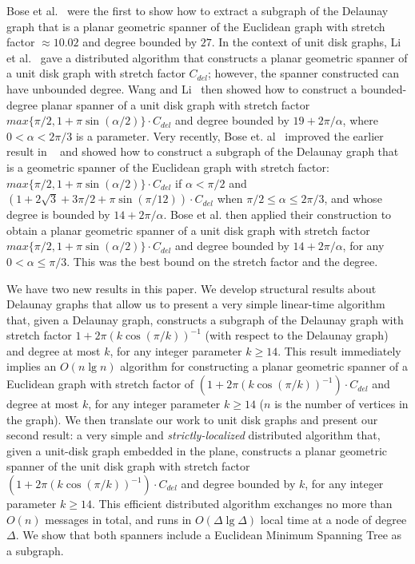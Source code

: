 \documentclass{stacs_proc}
\theoremstyle{plain}\newtheorem{satz}[thm]{Satz}
\begin{document}
Bose et al.~\cite{boseesa,bosealgorithmica} were the first to show
how to extract a subgraph of the Delaunay graph that is a planar
geometric spanner of the Euclidean graph with
stretch factor $\approx 10.02$ and degree bounded by $27$. In the
context of unit disk graphs, Li et
al.~\cite{iitunbounded1,iitunbounded} gave a distributed algorithm
that constructs a planar geometric spanner of a unit disk graph with
stretch factor $C_{del}$; however, the spanner constructed can have
unbounded degree. Wang and Li~\cite{iitbounded1,iitbounded} then
showed how to construct a bounded-degree planar spanner of a unit
disk graph with stretch factor $max\{\pi/2, 1+
\pi\sin{(\alpha/2)}\}\cdot C_{del}$ and degree bounded by $19 +
2\pi/\alpha$, where $0< \alpha < 2\pi/3$ is a parameter. Very
recently, Bose et. al~\cite{bose1} improved the earlier result in
~\cite{boseesa,bosealgorithmica} and showed how to construct a
subgraph of the Delaunay graph that is a geometric spanner of the
Euclidean graph with stretch factor: $max\{\pi/2, 1+
\pi\sin{(\alpha/2)}\}\cdot C_{del}$ if $\alpha < \pi/2$ and $(1 +
2\sqrt{3} + 3\pi/2 + \pi\sin{(\pi/12)})\cdot C_{del}$ when $\pi/2
\leq \alpha \leq 2\pi/3$, and whose degree is bounded by $14 +
2\pi/\alpha$. Bose et al. then applied their construction to obtain
a planar geometric spanner of a unit disk graph with stretch factor
$max\{\pi/2, 1+ \pi\sin{(\alpha/2)}\}\cdot C_{del}$ and degree
bounded by $14+ 2\pi/\alpha$, for any $0 < \alpha \leq \pi/3$. This
was the best bound on the stretch factor and the degree.

We have two new results in this paper. We develop structural results about
Delaunay graphs that allow us to present a very simple linear-time algorithm
that, given a Delaunay graph, constructs a subgraph of the Delaunay graph
with stretch factor $1 + 2\pi(k \cos{(\pi/k)})^{-1}$ (with respect
to the Delaunay graph) and degree at most $k$, for any integer
parameter $k\geq 14$. This result immediately implies an $O(n\lg{n})$
algorithm for constructing a planar geometric spanner of a Euclidean graph
with stretch factor of $(1 + 2\pi(k \cos{(\pi/k)})^{-1})\cdot
C_{del}$ and degree at most $k$, for any integer parameter $k \geq
14$ ($n$ is the number of vertices in the graph). We then translate our
work to unit disk graphs and present our second result: a
very simple and {\em strictly-localized} distributed algorithm that, given a
unit-disk graph embedded in the plane, constructs a planar geometric spanner
of the unit disk graph with stretch factor $(1 + 2\pi(k
\cos{(\pi/k)})^{-1})\cdot C_{del}$ and degree bounded by $k$, for
any integer parameter $k \geq 14$. This efficient distributed algorithm
exchanges no more than $O(n)$ messages in total, and runs in $O(\Delta
\lg{\Delta})$ local time at a node of degree $\Delta$. We show that both
spanners include a Euclidean Minimum Spanning Tree as a subgraph.
\end{document}
